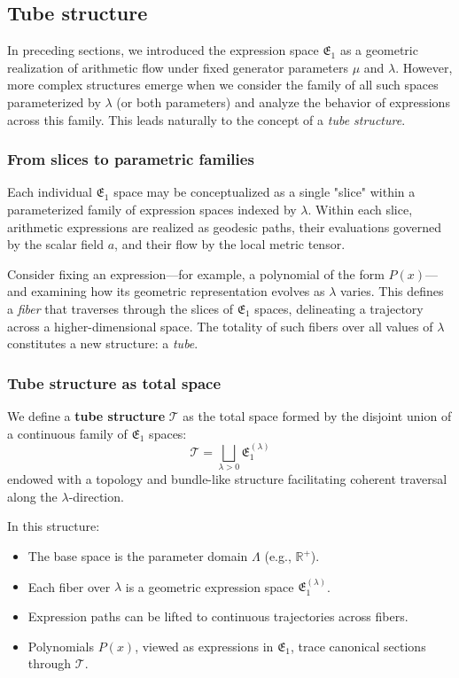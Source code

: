 \subsection{Tube structure}\label{sec:tubestructure}

In preceding sections, we introduced the expression space $\mathfrak{E}_1$ as a geometric realization of arithmetic flow under fixed generator parameters $\mu$ and $\lambda$. However, more complex structures emerge when we consider the family of all such spaces parameterized by $\lambda$ (or both parameters) and analyze the behavior of expressions across this family. This leads naturally to the concept of a \emph{tube structure}.

\subsubsection{From slices to parametric families}

Each individual $\mathfrak{E}_1$ space may be conceptualized as a single "slice" within a parameterized family of expression spaces indexed by $\lambda$. Within each slice, arithmetic expressions are realized as geodesic paths, their evaluations governed by the scalar field $a$, and their flow by the local metric tensor.

Consider fixing an expression—for example, a polynomial of the form $P(x)$—and examining how its geometric representation evolves as $\lambda$ varies. This defines a \emph{fiber} that traverses through the slices of $\mathfrak{E}_1$ spaces, delineating a trajectory across a higher-dimensional space. The totality of such fibers over all values of $\lambda$ constitutes a new structure: a \emph{tube}.

\subsubsection{Tube structure as total space}

We define a \textbf{tube structure} $\mathcal{T}$ as the total space formed by the disjoint union of a continuous family of $\mathfrak{E}_1$ spaces:
\begin{equation}
\mathcal{T} = \bigsqcup_{\lambda > 0} \mathfrak{E}_1^{(\lambda)}
\end{equation}
endowed with a topology and bundle-like structure facilitating coherent traversal along the $\lambda$-direction.

In this structure:
\begin{itemize}
\item The base space is the parameter domain $\Lambda$ (e.g., $\mathbb{R}^+$).
\item Each fiber over $\lambda$ is a geometric expression space $\mathfrak{E}_1^{(\lambda)}$.
\item Expression paths can be lifted to continuous trajectories across fibers.
\item Polynomials $P(x)$, viewed as expressions in $\mathfrak{E}_1$, trace canonical sections through $\mathcal{T}$.
\end{itemize}

